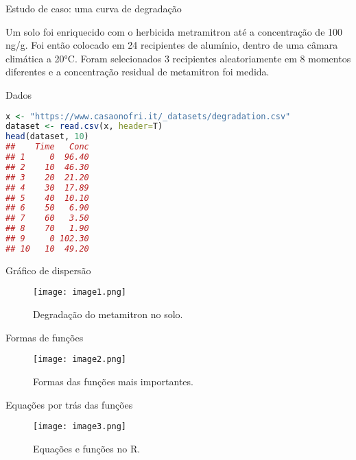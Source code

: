 \documentclass[xcolor=dvipsnames]{beamer}
\begin{document}
       \begin{frame}{Estudo de caso: uma curva de degradação}

       Um solo foi enriquecido com o herbicida metramitron até a concentração de 100 ng/g. Foi então colocado em 24 recipientes de alumínio, dentro de uma câmara climática a 20°C. Foram selecionados 3 recipientes aleatoriamente em 8 momentos diferentes e a concentração residual de metamitron foi medida.
           
       \end{frame}

 
        \begin{frame}[fragile]{Dados}
           \begin{lstlisting}[language=R]
x <- "https://www.casaonofri.it/_datasets/degradation.csv"
dataset <- read.csv(x, header=T)
head(dataset, 10)
##    Time   Conc
## 1     0  96.40
## 2    10  46.30
## 3    20  21.20
## 4    30  17.89
## 5    40  10.10
## 6    50   6.90
## 7    60   3.50
## 8    70   1.90
## 9     0 102.30
## 10   10  49.20
           \end{lstlisting}
        \end{frame}

        \begin{frame}{Gráfico de dispersão}
           \begin{figure}[h]
          
           \texttt{[image: image1.png]}
            \caption{Degradação do metamitron no solo.}
    
          \end{figure}
        \end{frame}

        \begin{frame}{Formas de funções}
        
           \begin{figure}[h]
          
           \texttt{[image: image2.png]}
            \caption{Formas das funções mais importantes.}
    
          \end{figure}
        \end{frame}

         \begin{frame}{Equações por trás das funções}
        
           \begin{figure}[h]
          
           \texttt{[image: image3.png]}
            \caption{Equações e funções no R.}
    
          \end{figure}
        \end{frame}
\end{document}
